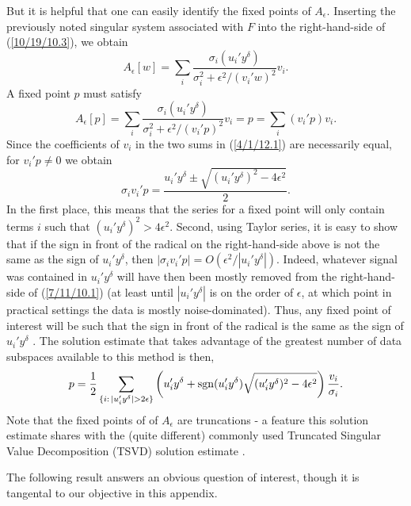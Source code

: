 \documentclass{amsart}
\numberwithin{equation}{section}
\theoremstyle{definition}
\numberwithin{theorem}{section}
\begin{document}
 
But it is helpful that one can easily identify the fixed points of $A_\epsilon$. Inserting the previously noted
singular system associated with $F$ into the right-hand-side of (\ref{10/19/10.3}),  we obtain \begin{equation}\label{3/31/12.3} A_\epsilon[w] = \sum_i \frac{\sigma_i (u_i'y^\delta)}{\sigma_i^2 + \epsilon^2/(v_i'w)^2}v_i .\end{equation} A fixed point $p$ must satisfy  \begin{equation}\label{4/1/12.1} A_\epsilon[p] = \sum_i  \frac{\sigma_i (u_i'y^\delta)}{\sigma_i^2 + \epsilon^2/(v_i'p)^2}v_i = p = \sum_i  (v_i' p)v_i.\end{equation}  Since the coefficients of $v_i$ in the two sums in (\ref{4/1/12.1}) are necessarily equal, for $v_i'p\ne 0$ we obtain \begin{equation}\label{7/11/10.1} \sigma_iv_i'p = \frac{u_i' y^\delta \pm \sqrt{(u_i'y^\delta)^2 -4\epsilon^2}}{2}.\end{equation}  In the first place, this means that the series for a fixed point will only contain terms $i$ such that $(u_i'y^\delta)^2 >4\epsilon^2$.  Second, using Taylor series, it is easy to show that if the sign in front of the radical on the right-hand-side above is not the same as the sign of $u_i'y^\delta$, then $|\sigma_i v_i'p| =  O(\epsilon^2/|u_i'y^\delta|)$.  Indeed, whatever signal
 was contained in $u_i'y^\delta$ will have then been mostly 
 removed from the right-hand-side of (\ref{7/11/10.1}) (at least until $|u_i'y^\delta|$ is on the order of $\epsilon$, at which point in practical settings the data is mostly noise-dominated).   Thus, any fixed point of interest will be such that the sign in front of the radical is the same as the sign of $u_i'y^\delta$ .   The solution estimate that takes advantage of the greatest number of data subspaces available to this method is then,
\begin{equation}\label{7/19/10.1} p = \frac{1}{2}\sum_{\{i:\,|u_i'y^\delta|>2\epsilon\}} \left(u_i' y^\delta + {\rm sgn}(u_i' y^\delta) \sqrt{(u_i'y^\delta)^2 -4\epsilon^2}\right)\frac{v_i}{\sigma_i}.\end{equation}      
Note that the fixed points of of $A_\epsilon$ are truncations - a feature this solution estimate shares with the (quite different)  commonly used Truncated Singular Value Decomposition (TSVD) solution estimate \cite{vogel:2002}.  

The following result answers an obvious question of interest, though it is tangental to our objective in this appendix.
\end{document}
